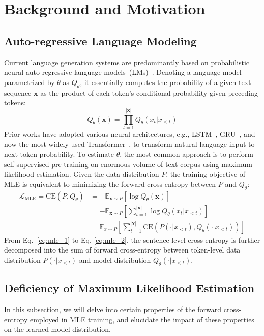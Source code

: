 \section{Background and Motivation}
\label{sec:bg}
\subsection{Auto-regressive Language Modeling}
Current language generation systems are predominantly based on probabilistic neural auto-regressive language models~(LMs)~\citep{bengio2000neural}. Denoting a language model parametrized by $\theta$ as $Q_{\theta}$, it essentially computes the 
probability of a given text sequence $\bm{x}$ as the product of each token's conditional probability given preceding tokens:
\begin{equation}
    Q_{\theta}(\bm{x})=\prod_{t=1}^{|\bm{x}|}Q_{\theta}(x_t|x_{<t})
    \label{eq:prob}
\end{equation}
Prior works have adopted various neural architectures, e.g., LSTM~\citep{lstm}, GRU~\citep{gru}, and now the most widely used Transformer~\citep{transformer}, to transform natural language input to next token probability. To estimate $\theta$, the most common approach is to perform self-supervised pre-training on enormous 
volume of text corpus using maximum likelihood estimation. Given the data distribution $P$, the training objective of MLE is equivalent to minimizing the forward cross-entropy between $P$ and $Q_{\theta}$:
\begin{align} 
    \label{eq:mle_1}
    \mathcal{L}_{\text{MLE}}=\text{CE}(P,Q_{\theta})&=-\mathbb{E}_{\bm{x}\sim P}[\log{Q_{\theta}(\bm{x})}] \\
    &=-\mathbb{E}_{\bm{x}\sim P}[\sum_{t=1}^{|\bm{x}|}\log{Q_{\theta}(x_t|x_{<t})}] \\
    &=\mathbb{E}_{x\sim P}[\sum_{t=1}^{|\bm{x}|}\text{CE}(P(\cdot|x_{<t}), Q_{\theta}(\cdot|x_{<t}))]
    \label{eq:mle_2}
\end{align}
From Eq.~\ref{eq:mle_1} to Eq. \ref{eq:mle_2}, the sentence-level cross-entropy is further decomposed into the sum of forward cross-entropy between token-level data distribution $P(\cdot|x_{<t})$ and model distribution $Q_{\theta}(\cdot|x_{<t})$.

\subsection{Deficiency of Maximum Likelihood Estimation}
\label{sec:deficiency}
In this subsection, we will delve into certain properties of the forward cross-entropy employed in MLE training, and elucidate the impact of these properties on the learned model distribution.
